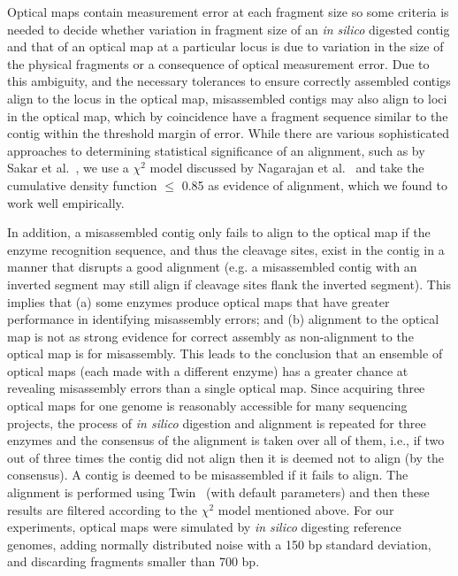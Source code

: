 Optical maps contain measurement error at each fragment size so some criteria is needed to decide whether variation in fragment size of an {\em in silico} digested contig and that of an optical map at a particular locus is due to variation in the size of the physical fragments or a consequence of optical measurement error.  
Due to this ambiguity, and the necessary tolerances to ensure correctly assembled contigs align to the locus in the optical map, misassembled contigs may also align to loci in the optical map, which by coincidence have a fragment sequence similar to the contig within the threshold margin of error.  
While there are various sophisticated approaches to determining statistical significance of an alignment, such as by Sakar et al.~\cite{statsigORMalign}, we use a $ \chi^2 $ model discussed by Nagarajan et al.~\cite{soma} and take the cumulative density function $\le$ 0.85 as evidence of alignment, which we found to work well empirically.

In addition, a misassembled contig only fails to align to the optical map if the enzyme recognition sequence, and thus the cleavage sites, exist in the contig in a manner that disrupts a good alignment (e.g. a misassembled contig with an inverted segment may still align if cleavage sites flank the inverted segment).
This implies that (a) some enzymes produce optical maps that have greater performance in identifying misassembly errors; and (b) alignment to the optical map is not as strong evidence for correct assembly as non-alignment to the optical map is for misassembly. 
This leads to the conclusion that an ensemble of optical maps (each made with a different enzyme) has a greater chance at revealing misassembly errors than a single optical map.  
Since acquiring three optical maps for one genome is reasonably accessible for many sequencing projects, the process of {\em in silico} digestion and alignment is repeated for three enzymes and the consensus of the alignment is taken over all of them, i.e., if two out of three times the contig did not align then it is deemed not to align (by the consensus).
A contig is deemed to be misassembled if it fails to align. The alignment is performed using Twin~\cite{wabi2014} (with default parameters) and then these results are filtered according to the $ \chi^2 $ model mentioned above.  
For our experiments, optical maps were simulated by {\em in silico} digesting reference genomes, adding normally distributed noise with a 150 bp standard deviation, and discarding fragments smaller than 700 bp.


